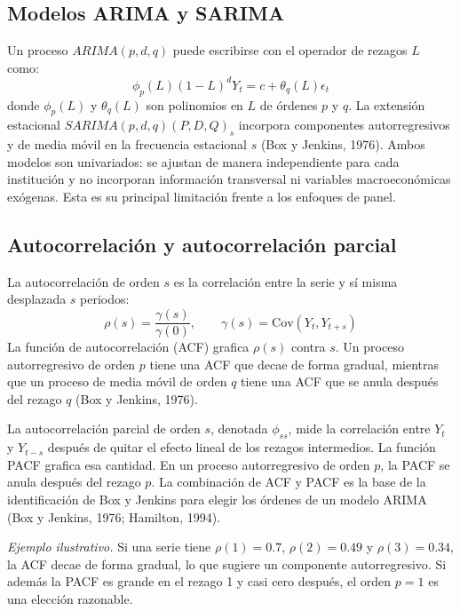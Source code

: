 \subsection{Modelos ARIMA y SARIMA}
Un proceso $ARIMA(p,d,q)$ puede escribirse con el operador de rezagos $L$ como:
\begin{equation}
\phi_p(L)(1-L)^d Y_t = c + \theta_q(L)\epsilon_t
\label{eq:arima}
\end{equation}
donde $\phi_p(L)$ y $\theta_q(L)$ son polinomios en $L$ de órdenes $p$ y $q$. La extensión estacional $SARIMA(p,d,q)(P,D,Q)_s$ incorpora componentes autorregresivos y de media móvil en la frecuencia estacional $s$ (Box y Jenkins, 1976). Ambos modelos son univariados: se ajustan de manera independiente para cada institución y no incorporan información transversal ni variables macroeconómicas exógenas. Esta es su principal limitación frente a los enfoques de panel.

\subsection{Autocorrelación y autocorrelación parcial}
La autocorrelación de orden $s$ es la correlación entre la serie y sí misma desplazada $s$ periodos:
\begin{equation}
\rho(s)=\frac{\gamma(s)}{\gamma(0)}, \qquad \gamma(s)=\text{Cov}(Y_t,Y_{t+s})
\label{eq:acf}
\end{equation}
La función de autocorrelación (ACF) grafica $\rho(s)$ contra $s$. Un proceso autorregresivo de orden $p$ tiene una ACF que decae de forma gradual, mientras que un proceso de media móvil de orden $q$ tiene una ACF que se anula después del rezago $q$ (Box y Jenkins, 1976).

La autocorrelación parcial de orden $s$, denotada $\phi_{ss}$, mide la correlación entre $Y_t$ y $Y_{t-s}$ después de quitar el efecto lineal de los rezagos intermedios. La función PACF grafica esa cantidad. En un proceso autorregresivo de orden $p$, la PACF se anula después del rezago $p$. La combinación de ACF y PACF es la base de la identificación de Box y Jenkins para elegir los órdenes de un modelo ARIMA (Box y Jenkins, 1976; Hamilton, 1994).

\textit{Ejemplo ilustrativo.} Si una serie tiene $\rho(1)=0.7$, $\rho(2)=0.49$ y $\rho(3)=0.34$, la ACF decae de forma gradual, lo que sugiere un componente autorregresivo. Si además la PACF es grande en el rezago 1 y casi cero después, el orden $p=1$ es una elección razonable.

